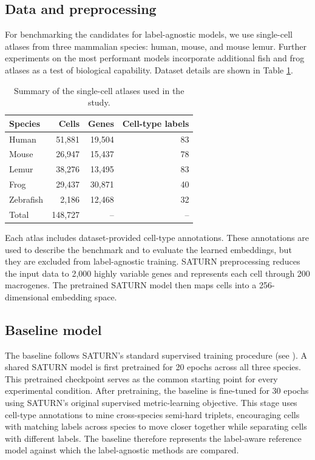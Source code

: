 \documentclass{article}
\begin{document}
\subsection{Data and preprocessing}
For benchmarking the candidates for label-agnostic models, we use single-cell atlases from three mammalian species: human, mouse, and mouse lemur. Further experiments on the most performant models incorporate additional fish and frog atlases as a test of biological capability. Dataset details are shown in Table \ref{tab:benchmark-datasets}.
\begin{table}[ht]
\centering
\begin{tabular}{lrrr}
\hline
Species & Cells & Genes & Cell-type labels \\
\hline
Human & 51,881 & 19,504 & 83 \\
Mouse & 26,947 & 15,437 & 78 \\
Lemur & 38,276 & 13,495 & 83 \\
\hline
Frog & 29,437 & 30,871 & 40 \\
Zebrafish & 2,186 & 12,468 & 32 \\
\hline
Total & 148,727 & -- & -- \\
\hline
\end{tabular}
\caption{Summary of the single-cell atlases used in the study.}
\label{tab:benchmark-datasets}
\end{table}

Each atlas includes dataset-provided cell-type annotations. These annotations are used to describe the benchmark and to evaluate the learned embeddings, but they are excluded from label-agnostic training. SATURN preprocessing reduces the input data to 2,000 highly variable genes and represents each cell through 200 macrogenes. The pretrained SATURN model then maps cells into a 256-dimensional embedding space.

\subsection{Baseline model}
The baseline follows SATURN’s standard supervised training procedure (see \cite{SATURN}). A shared SATURN model is first pretrained for 20 epochs across all three species. This pretrained checkpoint serves as the common starting point for every experimental condition. After pretraining, the baseline is fine-tuned for 30 epochs using SATURN’s original supervised metric-learning objective. This stage uses cell-type annotations to mine cross-species semi-hard triplets, encouraging cells with matching labels across species to move closer together while separating cells with different labels. The baseline therefore represents the label-aware reference model against which the label-agnostic methods are compared.
\end{document}

